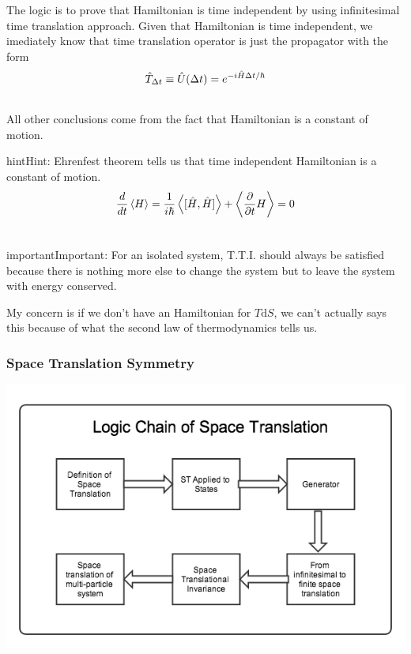 \documentclass[letterpaper,10pt,english]{sphinxmanual}
\newcommand{\avg}[1]{\left< #1 \right>}
\begin{document}
The logic is to prove that Hamiltonian is time independent by using infinitesimal time translation approach. Given that Hamiltonian is time independent, we imediately know that time translation operator is just the propagator with the form
\begin{gather}
\begin{split}\hat T_{\Delta t} \equiv \hat U(\Delta t) = e^{-i \hat H \Delta t /\hbar}\end{split}\notag\\\begin{split}\end{split}\notag
\end{gather}
All other conclusions come from the fact that Hamiltonian is a constant of motion.

\begin{notice}{hint}{Hint:}
Ehrenfest theorem tells us that time independent Hamiltonian is a constant of motion.
\begin{gather}
\begin{split}\frac{d}{dt}\avg{H} = \frac{1}{i\hbar}\avg{[\hat H, \hat H]} + \avg{\frac{\partial}{\partial t} H } = 0\end{split}\notag\\\begin{split}\end{split}\notag
\end{gather}\end{notice}

\begin{notice}{important}{Important:}
For an isolated system, T.T.I. should always be satisfied because there is nothing more else to change the system but to leave the system with energy conserved.

My concern is if we don't have an Hamiltonian for $T\mathrm d S$, we can't actually says this because of what the second law of thermodynamics tells us.
\end{notice}


\subsubsection{Space Translation Symmetry}
\label{symmetries:space-translation-symmetry}
{\hfill\includegraphics{SpaceTranslation.png}\hfill}
\end{document}
